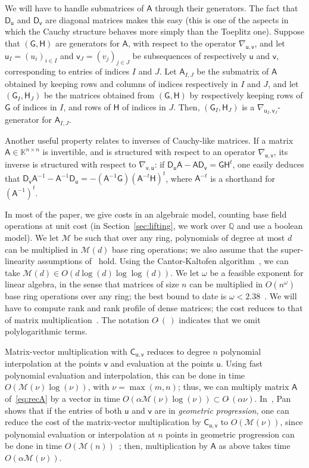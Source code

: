 \documentclass[sigconf]{acmart}
\newcommand{\vu}{\ensuremath{\mathsf{u}}}
\newcommand{\vv}{\ensuremath{\mathsf{v}}}
\newcommand{\mA}{\ensuremath{\mathsf{A}}}
\newcommand{\mC}{\ensuremath{\mathsf{C}}}
\newcommand{\mD}{\ensuremath{\mathsf{D}}}
\newcommand{\mG}{\ensuremath{\mathsf{G}}}
\newcommand{\mH}{\ensuremath{\mathsf{H}}}
\newcommand{\K}{\ensuremath{\mathbb{K}}}
\newcommand{\Q}{\ensuremath{\mathbb{Q}}}
\newcommand{\M}{\ensuremath{\mathscr{M}}}
\newcommand{\mx}{\ensuremath{\nu}}
\newcommand{\Otilde}[1]{\ensuremath{O\tilde{~}(#1)}} %
\theoremstyle{acmdefinition}
\begin{document}
We will have to handle submatrices of $\mA$ through their
generators. The fact that $\mD_{\vu}$ and $\mD_{\vv}$ are diagonal
matrices makes this easy (this is one of the aspects in which the
Cauchy structure behaves more simply than the Toeplitz one).  Suppose
that $(\mG,\mH)$ are generators for $\mA$, with respect to the
operator $\nabla_{\vu,\vv}$, and let $\vu_I=(u_i)_{i \in I}$ and
$\vv_J=(v_j)_{j \in J}$ be subsequences of respectively $\vu$ and
$\vv$, corresponding to entries of indices $I$ and $J$. Let
$\mA_{I,J}$ be the submatrix of $\mA$ obtained by keeping rows and
columns of indices respectively in $I$ and $J$, and let
$(\mG_I,\mH_J)$ be the matrices obtained from $(\mG,\mH)$ by
respectively keeping rows of $\mG$ of indices in $I$, and rows of
$\mH$ of indices in $J$. Then, $(\mG_I,\mH_J)$ is a
$\nabla_{\vu_I,\vv_J}$-generator for $\mA_{I,J}$.

Another useful property relates to inverses of Cauchy-like matrices.
If a matrix $\mA \in \K^{n\times n}$ is invertible, and is structured
with respect to an operator $\nabla_{\vu,\vv}$, its inverse is
structured with respect to $\nabla_{\vv,\vu}$: if $\mD_\vu \mA - \mA
\mD_\vv = \mG \mH^t$, one easily deduces that $\mD_\vv \mA^{-1} -
\mA^{-1} \mD_\vu = - (\mA^{-1} \mG) (\mA^{-t} \mH)^t$, where $\mA^{-t}$
is a shorthand for $(\mA^{-1})^t$.


\smallskip{}  In most of the paper, we
give costs in an algebraic model, counting base field operations at
unit cost (in Section~\ref{sec:lifting}, we work over $\Q$ and use 
a boolean model).
%
We let $\M$ be such that over any ring, polynomials of degree at most
$d$ can be multiplied in $\M(d)$ base ring operations; we also assume
that the super-linearity assumptions of~\cite[Chapter~8]{GaGe13}
hold. Using the Cantor-Kaltofen algorithm~\cite{CaKa91}, we can take
$\M(d)\in O(d \log(d)\log\log(d))$. We let $\omega$ be a feasible
exponent for linear algebra, in the sense that matrices of size $n$
can be multiplied in $O(n^\omega)$ base ring operations over any ring;
the best bound to date is $\omega < 2.38$~\cite{CoWi90, LeGall14}.  We
will have to compute rank and rank profile of dense matrices; the cost
reduces to that of matrix multiplication~\cite{IbMoHu82}. The notation
$\Otilde{\,}$ indicates that we omit polylogarithmic terms.

Matrix-vector multiplication with $\mC_{\vu,\vv}$ reduces to degree
$n$ polynomial interpolation at the points $\vv$ and evaluation at the
points $\vu$. Using fast polynomial evaluation and interpolation, this
can be done in time $O(\M(\mx)\log(\mx))$, with $\mx=\max(m,n)$; thus, we
can multiply matrix $\mA$ of~\eqref{eq:recA} by a vector in time
$O(\alpha \M(\mx)\log(\mx))\subset \Otilde{\alpha \mx}$.
In~\cite[Theorem~4.7.3]{Pan01}, Pan shows that if the entries of both
$\vu$ and $\vv$ are in {\em geometric progression}, one can reduce the
cost of the matrix-vector multiplication by $\mC_{\vu,\vv}$ to
$O(\M(\mx))$, since polynomial evaluation or interpolation at $n$
points in geometric progression can be done in time $O(\M(n))$~\cite{Bluestein70,BoSc05};
then, multiplication by $\mA$ as above takes time
$O(\alpha\M(\mx))$.
\end{document}
